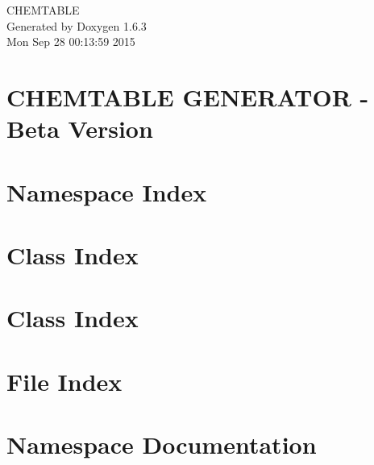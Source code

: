 \documentclass[a4paper]{book}
\begin{document}
\hypersetup{pageanchor=false}
\begin{titlepage}
\vspace*{7cm}
\begin{center}
{\Large CHEMTABLE }\\
\vspace*{1cm}
{\large Generated by Doxygen 1.6.3}\\
\vspace*{0.5cm}
{\small Mon Sep 28 00:13:59 2015}\\
\end{center}
\end{titlepage}
\clearemptydoublepage
{}
\tableofcontents
\clearemptydoublepage
{}
\hypersetup{pageanchor=true}
\chapter{CHEMTABLE GENERATOR -\/ Beta Version}
\label{index}\hypertarget{index}{}
\chapter{Namespace Index}

\chapter{Class Index}

\chapter{Class Index}

\chapter{File Index}

\chapter{Namespace Documentation}




\end{document}
